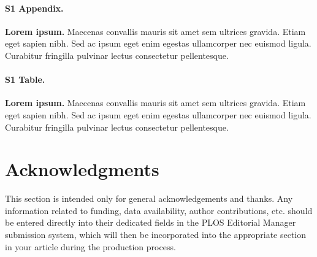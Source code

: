 \documentclass[10pt,letterpaper]{article}
\begin{document}
\paragraph*{S1 Appendix.}
\label{S1_Appendix}
\textbf{Lorem ipsum.} Maecenas convallis mauris sit amet sem ultrices gravida. Etiam eget sapien nibh. Sed ac ipsum eget enim egestas ullamcorper nec euismod ligula. Curabitur fringilla pulvinar lectus consectetur pellentesque.

\paragraph*{S1 Table.}
\label{S1_Table}
\textbf{Lorem ipsum.} Maecenas convallis mauris sit amet sem ultrices gravida. Etiam eget sapien nibh. Sed ac ipsum eget enim egestas ullamcorper nec euismod ligula. Curabitur fringilla pulvinar lectus consectetur pellentesque.

\section*{Acknowledgments}

This section is intended only for general acknowledgements and thanks. Any
information related to funding, data availability, author contributions, etc.
should be entered directly into their dedicated fields in the PLOS Editorial
Manager submission system, which will then be incorporated into the appropriate
section in your article during the production process.

\nolinenumbers

%
%


\end{document}

